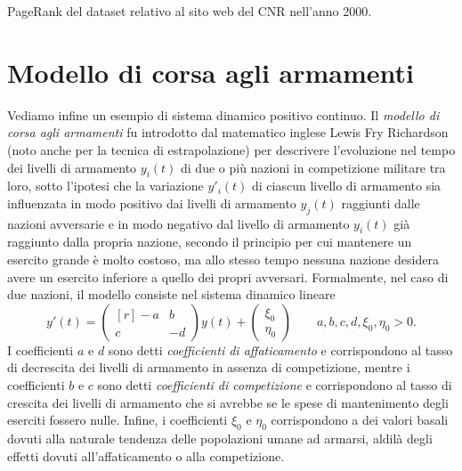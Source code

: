 


\begin{table}[p]
\caption{PageRank del dataset relativo al sito web del CNR nell'anno 2000.}
\label{tab:pagerank}
\centering
{}
\end{table}

\section{Modello di corsa agli armamenti}

Vediamo infine un esempio di sistema dinamico positivo continuo.
Il \emph{modello di corsa agli armamenti} fu introdotto dal matematico inglese
Lewis Fry Richardson (noto anche per la tecnica di estrapolazione)
per descrivere l'evoluzione nel tempo dei livelli di armamento $y_i(t)$
di due o più nazioni in competizione militare tra loro, sotto l'ipotesi che
la variazione $y'_i(t)$ di ciascun livello di armamento sia influenzata in modo
positivo dai livelli di armamento $y_j(t)$ raggiunti dalle nazioni avversarie
e in modo negativo dal livello di armamento $y_i(t)$ già raggiunto dalla
propria nazione, secondo il principio per cui mantenere un esercito grande
è molto costoso, ma allo stesso tempo nessuna nazione desidera avere un esercito
inferiore a quello dei propri avversari. Formalmente, nel caso di due
nazioni, il modello consiste nel sistema dinamico lineare
\[
y'(t) =
\begin{pmatrix*}[r]
-a & b \\
c & -d
\end{pmatrix*}
y(t) +
\begin{pmatrix}
\xi_0 \\
\eta_0
\end{pmatrix}
\qquad a,b,c,d, \xi_0, \eta_0 > 0.
\]
I coefficienti $a$ e $d$ sono detti \emph{coefficienti di affaticamento}
e corrispondono al tasso di decrescita dei livelli di armamento in assenza di
competizione, mentre i coefficienti $b$ e $c$ sono detti \emph{coefficienti
di competizione} e corrispondono al tasso di crescita dei livelli di armamento
che si avrebbe se le spese di mantenimento degli eserciti fossero nulle.
Infine, i coefficienti $\xi_0$ e $\eta_0$ corrispondono a dei valori
basali dovuti alla naturale tendenza delle popolazioni umane ad armarsi,
aldilà degli effetti dovuti all'affaticamento o alla competizione.

